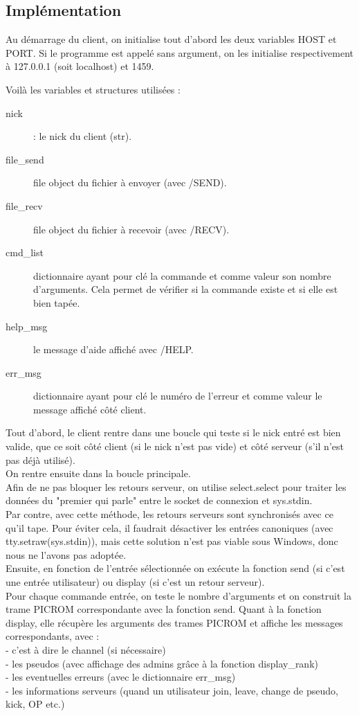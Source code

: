 \documentclass[12pt]{article}
\begin{document}
{\subsection{Implémentation}
Au démarrage du client, on initialise tout d'abord les deux variables HOST et PORT.
Si le programme est appelé sans argument, on les initialise respectivement à 127.0.0.1 (soit localhost) et 1459.

Voilà les variables et structures utilisées :
\begin{description}
    \item[nick] : le nick du client (str).
    \item[file\_send] file object du fichier à envoyer (avec /SEND).
    \item[file\_recv] file object du fichier à recevoir (avec /RECV).
    \item[cmd\_list] dictionnaire ayant pour clé la commande et comme valeur son nombre d'arguments. Cela permet de vérifier si la commande existe et si elle est bien tapée.
    \item[help\_msg] le message d'aide affiché avec /HELP.
    \item[err\_msg] dictionnaire ayant pour clé le numéro de l'erreur et comme valeur le message affiché côté client.
\end{description}

Tout d'abord, le client rentre dans une boucle qui teste si le nick entré est bien valide, que ce soit côté client (si le nick n'est pas vide) et côté serveur (s'il n'est pas déjà utilisé).
\\On rentre ensuite dans la boucle principale.
\\Afin de ne pas bloquer les retours serveur, on utilise select.select pour traiter les données du "premier qui parle" entre le socket de connexion et sys.stdin.
\\Par contre, avec cette méthode, les retours serveurs sont synchronisés avec ce qu'il tape. Pour éviter cela, il faudrait désactiver les entrées canoniques (avec tty.setraw(sys.stdin)), mais cette solution n'est pas viable sous Windows, donc nous ne l'avons pas adoptée.
\\Ensuite, en fonction de l'entrée sélectionnée on exécute la fonction send (si c'est une entrée utilisateur) ou display (si c'est un retour serveur).
\\Pour chaque commande entrée, on teste le nombre d'arguments et on construit la trame PICROM correspondante avec la fonction send. 
Quant à la fonction display, elle récupère les arguments des trames PICROM et affiche les messages correspondants, avec : \\
- c'est à dire le channel (si nécessaire)\\
- les pseudos (avec affichage des admins grâce à la fonction display\_rank)\\
- les eventuelles erreurs (avec le dictionnaire err\_msg)\\
- les informations serveurs (quand un utilisateur join, leave, change de pseudo, kick, OP etc.)\\

}
\end{document}

